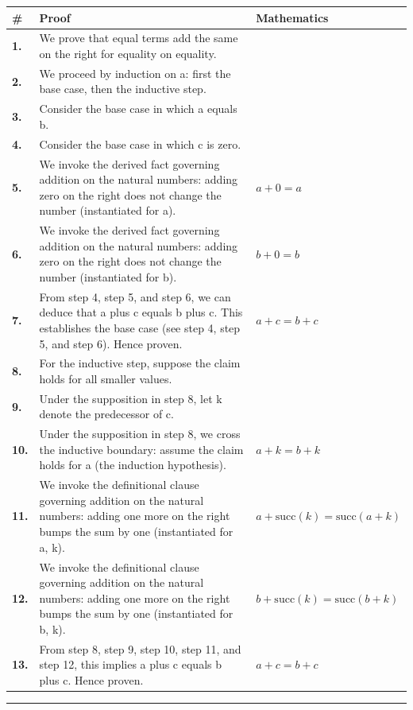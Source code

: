 \documentclass[11pt]{article}
\theoremstyle{definition}
\begin{document}
\begin{tabular}{@{} >{\raggedright\arraybackslash}p{} >{\raggedright\arraybackslash}p{} >{\raggedleft\arraybackslash}p{} @{}}
\textbf{\#} & \textbf{Proof} & \textbf{Mathematics} \\
\midrule
\textbf{1.} & We prove that equal terms add the same on the right for equality on equality. & \\[0.45em]
\textbf{2.} & We proceed by induction on a: first the base case, then the inductive step. & \\[0.45em]
\textbf{3.} & Consider the base case in which a  equals  b. & \\[0.45em]
\textbf{4.} & Consider the base case in which c is zero. & \\[0.45em]
\textbf{5.} & We invoke the derived fact governing addition on the natural numbers: adding zero on the right does not change the number (instantiated for a). & $\displaystyle a + 0 = a$ \\[0.45em]
\textbf{6.} & We invoke the derived fact governing addition on the natural numbers: adding zero on the right does not change the number (instantiated for b). & $\displaystyle b + 0 = b$ \\[0.45em]
\textbf{7.} & From step 4, step 5, and step 6, we can deduce that a plus c equals b plus c. This establishes the base case (see step 4, step 5, and step 6). Hence proven. & $\displaystyle a + c = b + c$ \\[0.45em]
\textbf{8.} & For the inductive step, suppose the claim holds for all smaller values. & \\[0.45em]
\textbf{9.} & Under the supposition in step 8, let k denote the predecessor of c. & \\[0.45em]
\textbf{10.} & Under the supposition in step 8, we cross the inductive boundary: assume the claim holds for a (the induction hypothesis). & $\displaystyle a + k = b + k$ \\[0.45em]
\textbf{11.} & We invoke the definitional clause governing addition on the natural numbers: adding one more on the right bumps the sum by one (instantiated for a, k). & $\displaystyle a + \mathrm{succ}(k) = \mathrm{succ}(a + k)$ \\[0.45em]
\textbf{12.} & We invoke the definitional clause governing addition on the natural numbers: adding one more on the right bumps the sum by one (instantiated for b, k). & $\displaystyle b + \mathrm{succ}(k) = \mathrm{succ}(b + k)$ \\[0.45em]
\textbf{13.} & From step 8, step 9, step 10, step 11, and step 12, this implies a plus c equals b plus c. Hence proven. & $\displaystyle a + c = b + c$ \\[0.45em]
\bottomrule
\end{tabular}
\label{thm:Eq-equality-equal_terms_add_the_same_on_the_right}
\par\medskip\hrule
\end{document}

